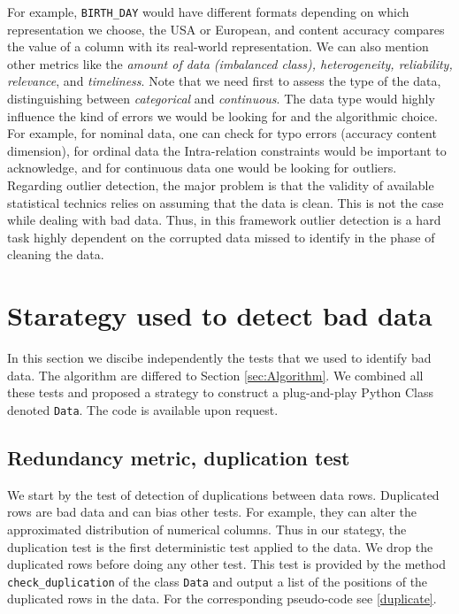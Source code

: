 \documentclass{article}
\begin{document}
For example, \texttt{BIRTH\_DAY} would have different formats depending on which representation we choose, the USA or European, and content accuracy compares the value of a column with its real-world representation.
We can also mention other metrics like the \textit{amount of data (imbalanced class), heterogeneity, reliability, relevance}, and \textit{timeliness}.
Note that we need first to assess the type of the data, distinguishing between \textit{categorical} and \textit{continuous}.
The data type would highly influence the kind of errors we would be looking for and the algorithmic choice.
For example, for nominal data, one can check for typo errors (accuracy content dimension), for ordinal data the Intra-relation constraints would be important to acknowledge, and for continuous data one would be looking for outliers.
Regarding outlier detection, the major problem is that the validity of available statistical technics relies on assuming that the data is clean.
This is not the case while dealing with bad data.
Thus, in this framework outlier detection is a hard task highly dependent on the corrupted data missed to identify in the phase of cleaning the data.
\section{Starategy used to detect bad data}
\label{sec:Starategy used to detect bad data}
In this section we discibe independently the tests that we used to identify bad data.
The algorithm are differed to Section \ref{sec:Algorithm}.
We combined all these tests and proposed a strategy to construct a plug-and-play Python Class denoted \texttt{Data}.
The code is available upon request.

\subsection{Redundancy metric, duplication test} %
\label{sub:Duplication test}
We start by the test of detection of duplications between data rows.
Duplicated rows are bad data and can bias other tests.
For example, they can alter the approximated distribution of numerical columns.
Thus in our stategy, the duplication test is the first deterministic test applied to the data.
We drop the duplicated rows before doing any other test.
This test is provided by the method \texttt{check\_duplication} of the class \texttt{Data} and output a list of the positions of the duplicated rows in the data.
For the corresponding pseudo-code see  \ref{duplicate}.
\end{document}
